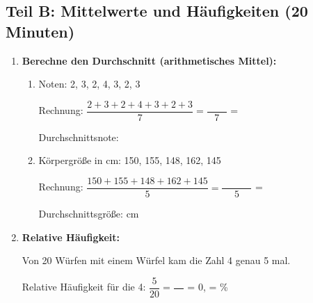 \subsection*{Teil B: Mittelwerte und Häufigkeiten (20 Minuten)}

\begin{enumerate}[resume, label=\arabic*.]
    \item \textbf{Berechne den Durchschnitt (arithmetisches Mittel):}
    \begin{enumerate}[label=\alph*)]
        \item Noten: 2, 3, 2, 4, 3, 2, 3

        Rechnung: $\dfrac{2 + 3 + 2 + 4 + 3 + 2 + 3}{7} = \dfrac{\phantom{0000}}{7}$ = \underline{\hspace{3cm}}

        Durchschnittsnote: \underline{\hspace{3cm}}

        \vspace{0.5cm}
        \item Körpergröße in cm: 150, 155, 148, 162, 145

        Rechnung: $\dfrac{150 + 155 + 148 + 162 + 145}{5} = \dfrac{\phantom{000000}}{5}$ = \underline{\hspace{3cm}}

        Durchschnittsgröße: \underline{\hspace{3cm}} cm
    \end{enumerate}

    \vspace{0.5cm}

    \item \textbf{Relative Häufigkeit:} 

    Von 20 Würfen mit einem Würfel kam die Zahl 4 genau 5 mal.

    Relative Häufigkeit für die 4: $\dfrac{5}{20} = \dfrac{\phantom{00}}{\phantom{00}}$ = 0,\underline{\hspace{1cm}} = \underline{\hspace{2cm}}\%
\end{enumerate}